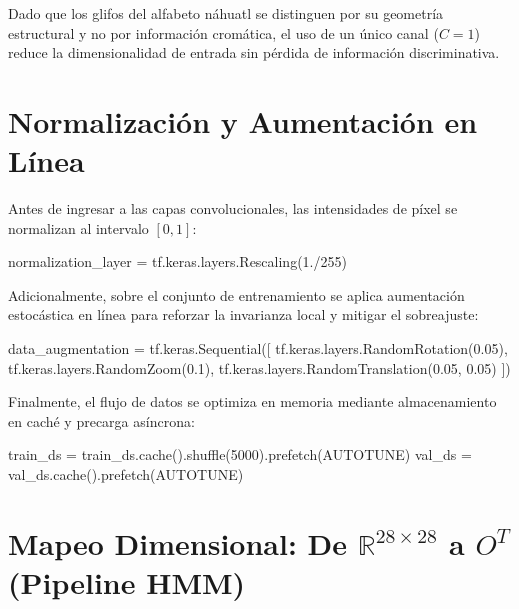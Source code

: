 \documentclass[
  spanish,
  us-letterpaper,
]{scrreprt}
\newenvironment{Shaded}{\begin{snugshade}}{\end{snugshade}}
\newcommand{\DecValTok}[1]{\textcolor[rgb]{0.68,0.00,0.00}{#1}}
\newcommand{\FloatTok}[1]{\textcolor[rgb]{0.68,0.00,0.00}{#1}}
\newcommand{\NormalTok}[1]{\textcolor[rgb]{0.00,0.23,0.31}{#1}}
\newcommand{\OperatorTok}[1]{\textcolor[rgb]{0.37,0.37,0.37}{#1}}
\theoremstyle{definition}
\theoremstyle{remark}
\begin{document}
Dado que los glifos del alfabeto náhuatl se distinguen por su geometría
estructural y no por información cromática, el uso de un único canal
(\(C = 1\)) reduce la dimensionalidad de entrada sin pérdida de
información discriminativa.

\section{Normalización y Aumentación en
Línea}\label{normalizaciuxf3n-y-aumentaciuxf3n-en-luxednea}

Antes de ingresar a las capas convolucionales, las intensidades de píxel
se normalizan al intervalo \([0, 1]\):

\begin{Shaded}
\begin{Highlighting}[]
\NormalTok{normalization\_layer }\OperatorTok{=}\NormalTok{ tf.keras.layers.Rescaling(}\FloatTok{1.}\OperatorTok{/}\DecValTok{255}\NormalTok{)}
\end{Highlighting}
\end{Shaded}

Adicionalmente, sobre el conjunto de entrenamiento se aplica aumentación
estocástica en línea para reforzar la invarianza local y mitigar el
sobreajuste:

\begin{Shaded}
\begin{Highlighting}[]
\NormalTok{data\_augmentation }\OperatorTok{=}\NormalTok{ tf.keras.Sequential([}
\NormalTok{    tf.keras.layers.RandomRotation(}\FloatTok{0.05}\NormalTok{),}
\NormalTok{    tf.keras.layers.RandomZoom(}\FloatTok{0.1}\NormalTok{),}
\NormalTok{    tf.keras.layers.RandomTranslation(}\FloatTok{0.05}\NormalTok{, }\FloatTok{0.05}\NormalTok{)}
\NormalTok{])}
\end{Highlighting}
\end{Shaded}

Finalmente, el flujo de datos se optimiza en memoria mediante
almacenamiento en caché y precarga asíncrona:

\begin{Shaded}
\begin{Highlighting}[]
\NormalTok{train\_ds }\OperatorTok{=}\NormalTok{ train\_ds.cache().shuffle(}\DecValTok{5000}\NormalTok{).prefetch(AUTOTUNE)}
\NormalTok{val\_ds }\OperatorTok{=}\NormalTok{ val\_ds.cache().prefetch(AUTOTUNE)}
\end{Highlighting}
\end{Shaded}

\section{\texorpdfstring{Mapeo Dimensional: De
\(\mathbb{R}^{28 \times 28}\) a \(O^T\) (Pipeline
HMM)}{Mapeo Dimensional: De \textbackslash mathbb\{R\}\^{}\{28 \textbackslash times 28\} a O\^{}T (Pipeline HMM)}}\label{mapeo-dimensional-de-mathbbr28-times-28-a-ot-pipeline-hmm}
\end{document}
